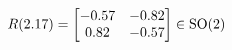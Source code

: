 \documentclass[preview]{standalone}
\begin{document}
\begin{align*}
\special{dvisvgm:raw <g id='unique000'>}R(2.17) = \begin{bmatrix} -0.57 & -0.82 \\ 0.82 & -0.57 \end{bmatrix} \in \text{SO}(2)\special{dvisvgm:raw </g>}
\end{align*}
\end{document}
